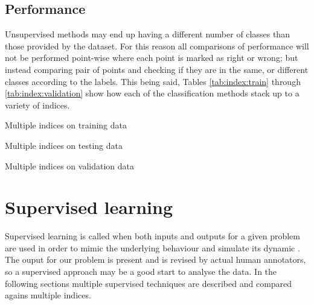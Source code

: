 \subsection{Performance}

Unsupervised methods may end up having a different number of classes than those
provided by the dataset. For this reason all comparisons of performance will not
be performed point-wise where each point is marked as right or wrong; but
instead comparing pair of points and checking if they are in the same, or
different classes according to the labels. This being said, Tables
\ref{tab:index:train} through \ref{tab:index:validation} show how each of the
classification methods stack up to a variety of indices.

\begin{table*}
    {\csvlinetotablerow}%
    \caption{Multiple indices on training data\label{tab:index:train}}
\end{table*}

\begin{table*}
    {\csvlinetotablerow}%
    \caption{Multiple indices on testing data\label{tab:index:test}}
\end{table*}

\begin{table*}
    {\csvlinetotablerow}%
    \caption{Multiple indices on validation data\label{tab:index:validation}}
\end{table*}

\section{Supervised learning\label{sec:supervised}} 

Supervised learning is called when both inputs and outputs for a given problem
are used in order to mimic the underlying behaviour and simulate its dynamic
\cite{supervised:definition:rusell}. The ouput for our problem is present and is
revised by actual human annotators, so a supervised approach may be a good start
to analyse the data. In the following sections multiple supervised techniques
are described and compared agains multiple indices.

